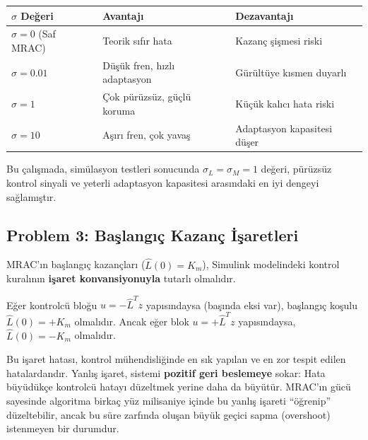 \documentclass[12pt,a4paper]{article}
\begin{document}
\begin{kavram}
\begin{center}
\begin{tabular}{lll}
\toprule
\textbf{$\sigma$ Değeri} & \textbf{Avantajı} & \textbf{Dezavantajı} \\
\midrule
$\sigma = 0$ (Saf MRAC) & Teorik sıfır hata & Kazanç şişmesi riski \\
$\sigma = 0.01$ & Düşük fren, hızlı adaptasyon & Gürültüye kısmen duyarlı \\
$\sigma = 1$ & Çok pürüzsüz, güçlü koruma & Küçük kalıcı hata riski \\
$\sigma = 10$ & Aşırı fren, çok yavaş & Adaptasyon kapasitesi düşer \\
\bottomrule
\end{tabular}
\end{center}
\end{kavram}

Bu çalışmada, simülasyon testleri sonucunda $\sigma_L = \sigma_M = 1$ değeri, pürüzsüz kontrol sinyali ve yeterli adaptasyon kapasitesi arasındaki en iyi dengeyi sağlamıştır.

\subsection{Problem 3: Başlangıç Kazanç İşaretleri}
\label{subsec:sign}

MRAC'ın başlangıç kazançları ($\hat{L}(0) = K_m$), Simulink modelindeki kontrol kuralının \textbf{işaret konvansiyonuyla} tutarlı olmalıdır.

Eğer kontrolcü bloğu $u = -\hat{L}^T z$ yapısındaysa (başında eksi var), başlangıç koşulu $\hat{L}(0) = +K_m$ olmalıdır. Ancak eğer blok $u = +\hat{L}^T z$ yapısındaysa, $\hat{L}(0) = -K_m$ olmalıdır.

\begin{dikkat}
Bu işaret hatası, kontrol mühendisliğinde en sık yapılan ve en zor tespit edilen hatalardandır. Yanlış işaret, sistemi \textbf{pozitif geri beslemeye} sokar: Hata büyüdükçe kontrolcü hatayı düzeltmek yerine daha da büyütür. MRAC'ın gücü sayesinde algoritma birkaç yüz milisaniye içinde bu yanlış işareti ``öğrenip'' düzeltebilir, ancak bu süre zarfında oluşan büyük geçici sapma (overshoot) istenmeyen bir durumdur.
\end{dikkat}



\end{document}
